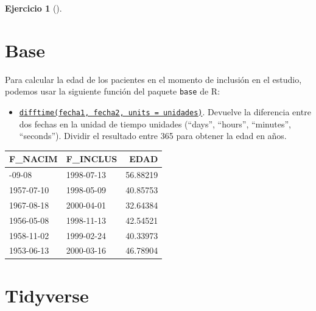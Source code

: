 \documentclass[
  a4paper,
]{scrreport}
\newenvironment{Shaded}{\begin{snugshade}}{\end{snugshade}}
\newcommand{\AttributeTok}[1]{\textcolor[rgb]{0.40,0.45,0.13}{#1}}
\newcommand{\DecValTok}[1]{\textcolor[rgb]{0.68,0.00,0.00}{#1}}
\newcommand{\FunctionTok}[1]{\textcolor[rgb]{0.28,0.35,0.67}{#1}}
\newcommand{\NormalTok}[1]{\textcolor[rgb]{0.00,0.23,0.31}{#1}}
\newcommand{\OtherTok}[1]{\textcolor[rgb]{0.00,0.23,0.31}{#1}}
\newcommand{\SpecialCharTok}[1]{\textcolor[rgb]{0.37,0.37,0.37}{#1}}
\newcommand{\StringTok}[1]{\textcolor[rgb]{0.13,0.47,0.30}{#1}}
\providecommand{\tightlist}{%
  \setlength{\itemsep}{0pt}\setlength{\parskip}{0pt}}\usepackage{longtable,booktabs,array}
\theoremstyle{definition}
\newtheorem{exercise}{Ejercicio}[chapter]
\theoremstyle{remark}
\begin{document}
\begin{exercise}[]
\begin{enumerate}
\begin{tcolorbox}
  \section{Base}

  Para calcular la edad de los pacientes en el momento de inclusión en
  el estudio, podemos usar la siguiente función del paquete
  \texttt{base} de R:

  \begin{itemize}
  \tightlist
  \item
    \href{https://rdrr.io/r/base/difftime.html}{\texttt{difftime(fecha1,\ fecha2,\ units\ =\ unidades)}}.
    Devuelve la diferencia entre dos fechas en la unidad de tiempo
    unidades (``days'', ``hours'', ``minutes'', ``seconds''). Dividir el
    resultado entre 365 para obtener la edad en años.
  \end{itemize}

\begin{Shaded}
\end{Shaded}

  \begin{longtable}[]{@{}llr@{}}
  \toprule\noalign{}
  F\_NACIM & F\_INCLUS & EDAD \\
  \midrule\noalign{}
  \endhead
  \bottomrule\noalign{}
  \endlastfoot
  1941-09-08 & 1998-07-13 & 56.88219 \\
  1957-07-10 & 1998-05-09 & 40.85753 \\
  1967-08-18 & 2000-04-01 & 32.64384 \\
  1956-05-08 & 1998-11-13 & 42.54521 \\
  1958-11-02 & 1999-02-24 & 40.33973 \\
  1953-06-13 & 2000-03-16 & 46.78904 \\
  \end{longtable}

  \section{Tidyverse}


\end{tcolorbox}
\end{enumerate}
\end{exercise}
\end{document}
